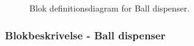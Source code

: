\documentclass[Arkitektur/System_main.tex]{subfiles}
\begin{document}
\begin{figure}[H]
    \centering
    \caption{Blok definitionsdiagram for Ball dispenser.}
    \label{fig:balldispenser_hardware_bdd}
\end{figure}

\subsubsection{Blokbeskrivelse - Ball dispenser} \label{sec:balldispenser_hardware_block_description}
\end{document}
